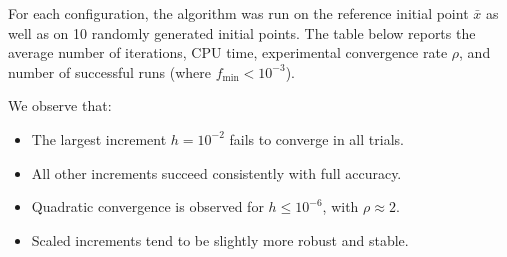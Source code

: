 \documentclass[a4paper,12pt]{article}
\begin{document}
	For each configuration, the algorithm was run on the reference initial point \( \bar{x} \) as well as on 10 randomly generated initial points. The table below reports the average number of iterations, CPU time, experimental convergence rate \( \rho \), and number of successful runs (where \( f_{\min} < 10^{-3} \)).
	
	We observe that:
	\begin{itemize}[nosep]
		\item The largest increment \( h = 10^{-2} \) fails to converge in all trials.
		\item All other increments succeed consistently with full accuracy.
		\item Quadratic convergence is observed for \( h \leq 10^{-6} \), with \(\rho \approx 2\).
		\item Scaled increments tend to be slightly more robust and stable.
	\end{itemize}
	
	\vspace{1em}
	
\end{document}
